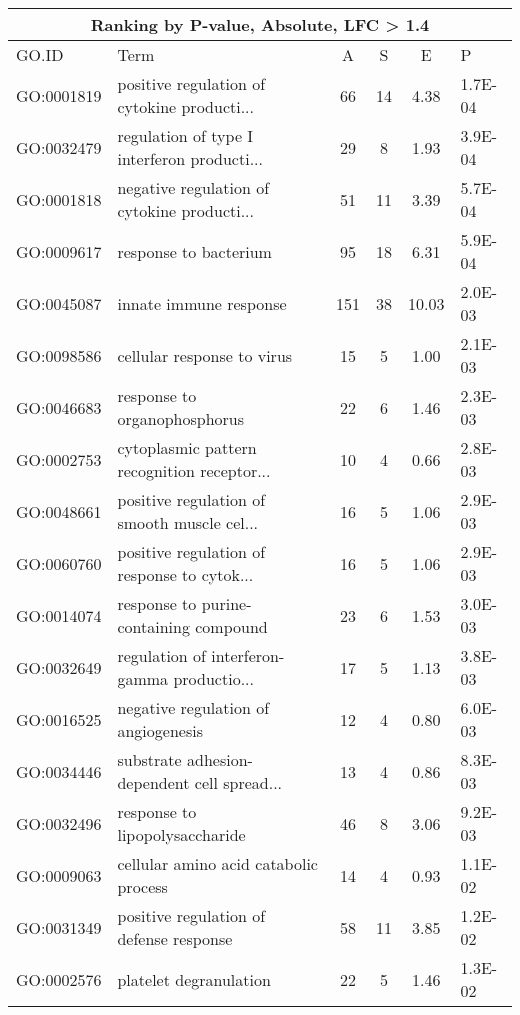 \begin{table}[ht]
\centering
\begin{tabular}{llcccl}
\multicolumn{6}{c}{\bf Ranking by P-value, Absolute, LFC > 1.4} \\
  \hline
GO.ID & Term & A & S & E & P \\ 
  \hline
GO:0001819 & positive regulation of cytokine producti... &  66 &  14 & 4.38 & 1.7E-04 \\ 
  GO:0032479 & regulation of type I interferon producti... &  29 &   8 & 1.93 & 3.9E-04 \\ 
  GO:0001818 & negative regulation of cytokine producti... &  51 &  11 & 3.39 & 5.7E-04 \\ 
  GO:0009617 & response to bacterium &  95 &  18 & 6.31 & 5.9E-04 \\ 
  GO:0045087 & innate immune response & 151 &  38 & 10.03 & 2.0E-03 \\ 
  GO:0098586 & cellular response to virus &  15 &   5 & 1.00 & 2.1E-03 \\ 
  GO:0046683 & response to organophosphorus &  22 &   6 & 1.46 & 2.3E-03 \\ 
  GO:0002753 & cytoplasmic pattern recognition receptor... &  10 &   4 & 0.66 & 2.8E-03 \\ 
  GO:0048661 & positive regulation of smooth muscle cel... &  16 &   5 & 1.06 & 2.9E-03 \\ 
  GO:0060760 & positive regulation of response to cytok... &  16 &   5 & 1.06 & 2.9E-03 \\ 
  GO:0014074 & response to purine-containing compound &  23 &   6 & 1.53 & 3.0E-03 \\ 
  GO:0032649 & regulation of interferon-gamma productio... &  17 &   5 & 1.13 & 3.8E-03 \\ 
  GO:0016525 & negative regulation of angiogenesis &  12 &   4 & 0.80 & 6.0E-03 \\ 
  GO:0034446 & substrate adhesion-dependent cell spread... &  13 &   4 & 0.86 & 8.3E-03 \\ 
  GO:0032496 & response to lipopolysaccharide &  46 &   8 & 3.06 & 9.2E-03 \\ 
  GO:0009063 & cellular amino acid catabolic process &  14 &   4 & 0.93 & 1.1E-02 \\ 
  GO:0031349 & positive regulation of defense response &  58 &  11 & 3.85 & 1.2E-02 \\ 
  GO:0002576 & platelet degranulation &  22 &   5 & 1.46 & 1.3E-02 \\ 

\end{tabular}
\end{table}
